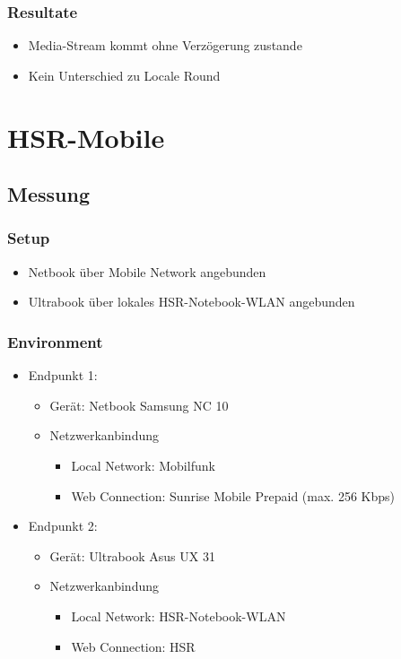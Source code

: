 			\subsubsection{Resultate}
				\begin{itemize}
					\item Media-Stream kommt ohne Verzögerung zustande
					\item Kein Unterschied zu Locale Round
				\end{itemize}

	
	\section{HSR-Mobile}
	
		\subsection{Messung}
		
			\subsubsection{Setup}
				\begin{itemize}
					\item Netbook über Mobile Network angebunden
					\item Ultrabook über lokales HSR-Notebook-WLAN angebunden
				\end{itemize}

			\subsubsection{Environment}
				\begin{itemize}
					\item Endpunkt 1:
						\begin{itemize}
						 	\item Gerät: Netbook Samsung NC 10
						 	\item Netzwerkanbindung
						 		\begin{itemize}
						 			\item Local Network: Mobilfunk
						 			\item Web Connection: Sunrise Mobile Prepaid (max. 256 Kbps)
						 		\end{itemize}
				 		\end{itemize}
					\item Endpunkt 2:
						\begin{itemize}
						 	\item Gerät: Ultrabook Asus UX 31
						 	\item Netzwerkanbindung
						 		\begin{itemize}
						 			\item Local Network: HSR-Notebook-WLAN
						 			\item Web Connection: HSR
						 		\end{itemize}
				 		\end{itemize}
				\end{itemize}
				
